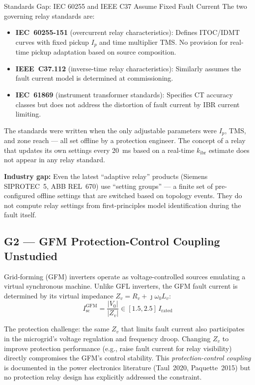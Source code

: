 \documentclass[12pt,a4paper]{article}
\newcommand{\kibr}{k_\mathrm{ibr}}
\begin{document}
\begin{warnbox}{Standards Gap: IEC 60255 and IEEE C37 Assume Fixed Fault Current}
The two governing relay standards are:
\begin{itemize}[nosep]
  \item \textbf{IEC~60255-151} (overcurrent relay characteristics): Defines
        ITOC/IDMT curves with fixed pickup $I_p$ and time multiplier TMS.
        No provision for real-time pickup adaptation based on source composition.
  \item \textbf{IEEE~C37.112} (inverse-time relay characteristics): Similarly
        assumes the fault current model is determined at commissioning.
  \item \textbf{IEC~61869} (instrument transformer standards): Specifies CT
        accuracy classes but does not address the distortion of fault current
        by IBR current limiting.
\end{itemize}

The standards were written when the only adjustable parameters were $I_p$,
TMS, and zone reach --- all set offline by a protection engineer.  The concept
of a relay that updates its own settings every 20~ms based on a real-time
$\kibr$ estimate does not appear in any relay standard.

\textbf{Industry gap:} Even the latest ``adaptive relay'' products (Siemens
SIPROTEC~5, ABB REL~670) use ``setting groups'' --- a finite set of pre-configured
offline settings that are switched based on topology events.  They do not compute
relay settings from first-principles model identification during the fault itself.
\end{warnbox}

\subsection{G2 --- GFM Protection-Control Coupling Unstudied}

Grid-forming (GFM) inverters operate as voltage-controlled sources emulating
a virtual synchronous machine.  Unlike GFL inverters, the GFM fault current is
determined by its virtual impedance $Z_v = R_v + \jmath\omega_0 L_v$:
\begin{equation}
  I_\mathrm{sc}^\mathrm{GFM} = \frac{|V_0|}{|Z_v|} \in [1.5, 2.5]\,I_\mathrm{rated}
  \label{eq:gfm_isc}
\end{equation}

The protection challenge: the same $Z_v$ that limits fault current also participates
in the microgrid's voltage regulation and frequency droop.  Changing $Z_v$ to improve
protection performance (e.g., raise fault current for relay visibility) directly
compromises the GFM's control stability.  This \emph{protection-control coupling}
is documented in the power electronics literature (Taul~2020, Paquette~2015) but no
protection relay design has explicitly addressed the constraint.
\end{document}
